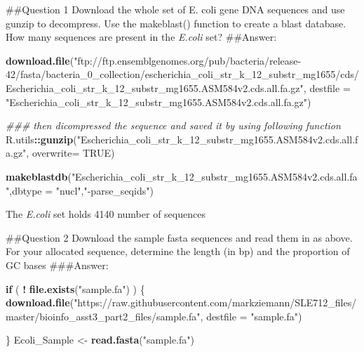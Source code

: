 \documentclass[]{article}
\newenvironment{Shaded}{\begin{snugshade}}{\end{snugshade}}
\newcommand{\CommentTok}[1]{\textcolor[rgb]{0.56,0.35,0.01}{\textit{#1}}}
\newcommand{\ControlFlowTok}[1]{\textcolor[rgb]{0.13,0.29,0.53}{\textbf{#1}}}
\newcommand{\DataTypeTok}[1]{\textcolor[rgb]{0.13,0.29,0.53}{#1}}
\newcommand{\KeywordTok}[1]{\textcolor[rgb]{0.13,0.29,0.53}{\textbf{#1}}}
\newcommand{\NormalTok}[1]{#1}
\newcommand{\OperatorTok}[1]{\textcolor[rgb]{0.81,0.36,0.00}{\textbf{#1}}}
\newcommand{\OtherTok}[1]{\textcolor[rgb]{0.56,0.35,0.01}{#1}}
\newcommand{\StringTok}[1]{\textcolor[rgb]{0.31,0.60,0.02}{#1}}
\begin{document}
\#\#Question 1 Download the whole set of E. coli gene DNA sequences and
use gunzip to decompress. Use the makeblast() function to create a blast
database. How many sequences are present in the \emph{E.coli} set?
\#\#Answer:

\begin{Shaded}
\begin{Highlighting}[]
\KeywordTok{download.file}\NormalTok{(}\StringTok{"ftp://ftp.ensemblgenomes.org/pub/bacteria/release-42/fasta/bacteria_0_collection/escherichia_coli_str_k_12_substr_mg1655/cds/Escherichia_coli_str_k_12_substr_mg1655.ASM584v2.cds.all.fa.gz"}\NormalTok{,}
              \DataTypeTok{destfile =} \StringTok{"Escherichia_coli_str_k_12_substr_mg1655.ASM584v2.cds.all.fa.gz"}\NormalTok{)}

\CommentTok{### then dicompressed the sequence and saved it by using following function }
\NormalTok{R.utils}\OperatorTok{::}\KeywordTok{gunzip}\NormalTok{(}\StringTok{"Escherichia_coli_str_k_12_substr_mg1655.ASM584v2.cds.all.fa.gz"}\NormalTok{, }\DataTypeTok{overwrite=} \OtherTok{TRUE}\NormalTok{)}

\KeywordTok{makeblastdb}\NormalTok{(}\StringTok{"Escherichia_coli_str_k_12_substr_mg1655.ASM584v2.cds.all.fa"}\NormalTok{,}\DataTypeTok{dbtype =} \StringTok{"nucl"}\NormalTok{,}\StringTok{"-parse_seqids"}\NormalTok{)}
\end{Highlighting}
\end{Shaded}

The \emph{E.coli} set holds 4140 number of sequences

\#\#Question 2 Download the sample fasta sequences and read them in as
above. For your allocated sequence, determine the length (in bp) and the
proportion of GC bases \#\#\#Answer:

\begin{Shaded}
\begin{Highlighting}[]
\ControlFlowTok{if}\NormalTok{ ( }\OperatorTok{!}\StringTok{ }\KeywordTok{file.exists}\NormalTok{(}\StringTok{"sample.fa"}\NormalTok{) ) \{}
  \KeywordTok{download.file}\NormalTok{(}\StringTok{"https://raw.githubusercontent.com/markziemann/SLE712_files/master/bioinfo_asst3_part2_files/sample.fa"}\NormalTok{,}
                \DataTypeTok{destfile =} \StringTok{"sample.fa"}\NormalTok{)}
 
\NormalTok{\}}
\NormalTok{Ecoli_Sample <-}\StringTok{ }\KeywordTok{read.fasta}\NormalTok{(}\StringTok{"sample.fa"}\NormalTok{)}
\end{Highlighting}
\end{Shaded}
\end{document}
